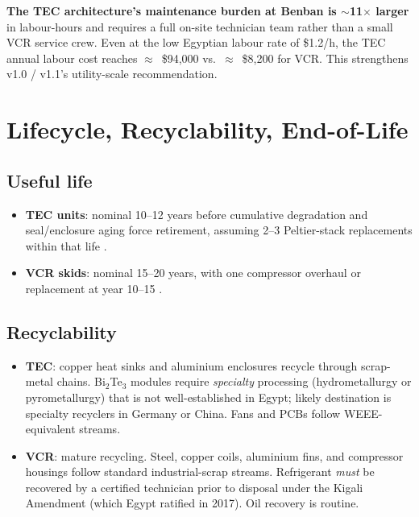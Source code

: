 \documentclass[11pt,a4paper]{article}
\begin{document}
\noindent
\textbf{The TEC architecture's maintenance burden at Benban is $\sim$11$\times$ larger} in labour-hours and requires a full on-site technician team rather than a small VCR service crew. Even at the low Egyptian labour rate of \$1.2/h, the TEC annual labour cost reaches $\approx$~\$94{,}000 vs.\ $\approx$~\$8{,}200 for VCR. This strengthens v1.0 / v1.1's utility-scale recommendation.

\section{Lifecycle, Recyclability, End-of-Life}
\label{sec:eol}

\subsection{Useful life}
\begin{itemize}[leftmargin=*]
  \item \textbf{TEC units}: nominal 10--12 years before cumulative degradation and seal/enclosure aging force retirement, assuming 2--3 Peltier-stack replacements within that life \citep{tec_reliability_wereszczak_2012,peltier_handbook_2018}.
  \item \textbf{VCR skids}: nominal 15--20 years, with one compressor overhaul or replacement at year 10--15 \citep{ashrae_hvac_maintenance_2021,doe_hvac_lifetime_2016}.
\end{itemize}

\subsection{Recyclability}
\begin{itemize}[leftmargin=*]
  \item \textbf{TEC}: copper heat sinks and aluminium enclosures recycle through scrap-metal chains. Bi$_2$Te$_3$ modules require \emph{specialty} processing (hydrometallurgy or pyrometallurgy) that is not well-established in Egypt; likely destination is specialty recyclers in Germany or China. Fans and PCBs follow WEEE-equivalent streams.
  \item \textbf{VCR}: mature recycling. Steel, copper coils, aluminium fins, and compressor housings follow standard industrial-scrap streams. Refrigerant \emph{must} be recovered by a certified technician prior to disposal under the Kigali Amendment \citep{unep_kigali_2016} (which Egypt ratified in 2017). Oil recovery is routine.
\end{itemize}
\end{document}
